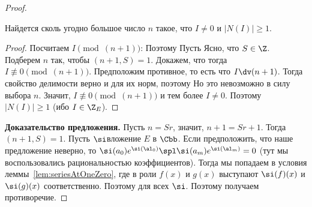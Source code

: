 \documentclass[a4paper]{article}
\def\nequiv{\not\equiv}
\begin{document}
\begin{proof}
\begin{lemma}
Найдется сколь угодно большое число $n$ такое, что $I\neq0$ и $|N(I)|\ge1$.
\end{lemma}
\begin{proof}
Посчитаем $I\pmod{(n+1)}$:
Поэтому
Пусть
Ясно, что $S\in \Z$. Подберем $n$ так, чтобы $(n+1,S)=1$. Докажем, что тогда $I\nequiv0\pmod{(n+1)}$. Предположим противное,
то есть что $I \dv (n+1)$. Тогда свойство делимости верно и для их норм, поэтому
Но это невозможно в силу выбора $n$. Значит, $I \nequiv 0\pmod{(n+1)}$ и тем более $I\neq0$. Поэтому
$|N(I)|\ge1$ (ибо $I\in\Z_E$).
\end{proof}

\medskip

\textbf{Доказательство предложения.} Пусть $n=Sr$, значит, $n+1=Sr+1$. Тогда $(n+1,S)=1$. Пусть $\si$\т вложение $E$ в $\Cbb$.
Если предположить, что наше предложение неверно, то
$\si(a_0)e^{\si(\al_0)}\spl \si(a_m)e^{\si(\al_m)}=0$ (тут мы воспользовались рациональностью коэффициентов). Тогда мы попадаем в условия леммы~\ref{lem:seriesAtOneZero}, где в роли
$f(x)$ и $g(x)$ выступают $\si(f)(x)$ и $\si(g)(x)$ соответственно. Поэтому
для всех $\si$.
Поэтому
получаем противоречие.
\end{proof}
\end{document}
